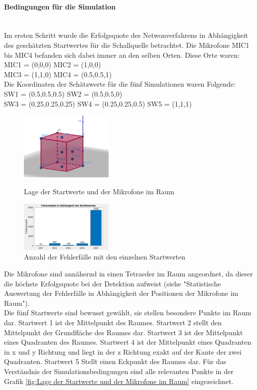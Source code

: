 \paragraph{Bedingungen für die Simulation}\ \\ 
Im ersten Schritt wurde die Erfolgsquote des Netwonverfahrens in Abhängigkeit des geschätzten Startwertes für die Schallquelle betrachtet. Die Mikrofone MIC1 bis MIC4 befanden sich dabei immer an den selben Orten. Diese Orte waren:\\
MIC1 = (0,0,0)
MIC2 = (1,0,0)\\
MIC3 = (1,1,0)
MIC4 = (0.5,0.5,1)\\
Die Koordinaten der Schätzwerte für die fünf Simulationen waren Folgende:\\
SW1 = (0.5,0.5,0.5)
SW2 = (0.5,0.5,0)\\
SW3 = (0.25,0.25,0.25)
SW4 = (0.25,0.25,0.5)
SW5 = (1,1,1)

\begin{figure}
\centering 
\includegraphics[width=0.4\textwidth]{Lage_MIC_Start_AW1}
\caption{Lage der Startwerte und der Mikrofone im Raum}\label{fig:Lage der Startwerte und der Mikrofone im Raum}
\includegraphics[width=0.4\textwidth]{StartwertZusammenfassung}
\caption{Anzahl der Fehlerfälle mit den einzelnen Startwerten}\label{fig:Anzahl der Fehlerfälle mit den einzelnen Startwerten}
\end{figure}
Die Mikrofone sind annähernd in einen Tetraeder im Raum angeordnet, da dieser die höchste Erfolgsquote bei der Detektion aufweist (siehe "Statistische Auswertung der Fehlerfälle in Abhängigkeit der Positionen der Mikrofone im Raum"). \\
Die fünf Startwerte sind bewusst gewählt, sie stellen besondere Punkte im Raum dar. Startwert 1 ist der Mittelpunkt des Raumes. Startwert 2 stellt den Mittelpunkt der Grundfläche des Raumes dar. Startwert 3 ist der Mittelpunkt eines Quadranten des Raumes. Startwert 4 ist der Mittelpunkt eines Quadranten in x und y Richtung und liegt in der z Richtung exakt auf der Kante der zwei Quadranten. Startwert 5 Stellt einen Eckpunkt des Raumes dar. 
Für das Verständnis der Simulationsbedingungen sind alle relevanten Punkte in der Grafik \ref{fig:Lage der Startwerte und der Mikrofone im Raum} eingezeichnet. \\

